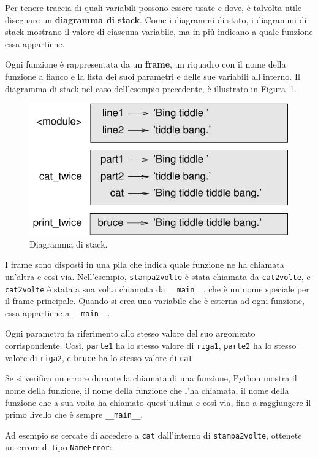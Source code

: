 \documentclass[10pt]{book}
\begin{document}
Per tenere traccia di quali variabili possono essere usate e dove, è talvolta utile disegnare un {\bf diagramma di stack}. Come i diagrammi di stato, i diagrammi di stack mostrano il valore di ciascuna variabile, ma in più indicano a quale funzione essa appartiene.

Ogni funzione è rappresentata da un {\bf frame}, un riquadro con il nome della funzione a fianco e la lista dei suoi parametri e delle sue variabili all'interno. Il diagramma di stack nel caso dell'esempio precedente, è illustrato in Figura~\ref{fig.stack}.

\begin{figure}
\centerline
{\includegraphics[scale=0.8]{figs/stack.pdf}}
\caption{Diagramma di stack.}
\label{fig.stack}
\end{figure}


I frame sono disposti in una pila che indica quale funzione ne ha chiamata un'altra e così via. Nell'esempio, \verb"stampa2volte" è stata chiamata da \verb"cat2volte", e \verb"cat2volte" è stata a sua volta chiamata da 
\verb"__main__", che è un nome speciale per il frame principale. Quando si crea una variabile che è esterna ad ogni funzione, essa appartiene a 
\verb"__main__".

Ogni parametro fa riferimento allo stesso valore del suo argomento corrispondente. Così, {\tt parte1} ha lo stesso valore di
{\tt riga1}, {\tt parte2} ha lo stesso valore di {\tt riga2},
e {\tt bruce} ha lo stesso valore di {\tt cat}.

Se si verifica un errore durante la chiamata di una funzione, Python mostra il nome della funzione, il nome della funzione che l'ha chiamata, il nome della funzione che a sua volta ha chiamato quest'ultima e così via, fino a raggiungere il primo livello che è sempre \verb"__main__".

Ad esempio se cercate di accedere a {\tt cat} dall'interno di
\verb"stampa2volte", ottenete un errore di tipo {\tt NameError}:
\end{document}
